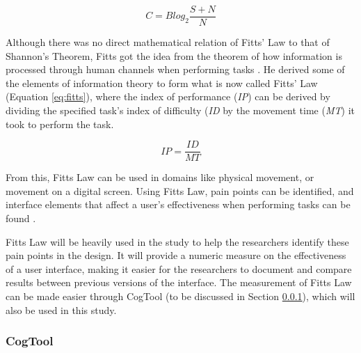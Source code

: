             \begin{equation}
            	\label{eq:shannon}
            	C = Blog_2 \frac{S + N}{N}
            \end{equation}
    
    		Although there was no direct mathematical relation of Fitts' Law to that of Shannon's Theorem, Fitts got the idea from the theorem of how information is processed through human channels when performing tasks \citep{mackenzie1992fitts}. He derived some of the elements of information theory to form what is now called Fitts' Law (Equation \ref{eq:fitts}), where the index of performance (\textit{IP}) can be derived by dividing the specified task's index of difficulty (\textit{ID} by the movement time (\textit{MT}) it took to perform the task. 
            
            \begin{equation}
            	\label{eq:fitts}
            	IP = \frac{ID}{MT}
            \end{equation}
            
            From this, Fitts Law can be used in domains like physical movement, or movement on a digital screen. Using Fitts Law, pain points can be identified, and interface elements that affect a user's effectiveness when performing tasks can be found \citep{mackenzie1992fitts}. 
            
            Fitts Law will be heavily used in the study to help the researchers identify these pain points in the design. It will provide a numeric measure on the effectiveness of a user interface, making it easier for the researchers to document and compare results between previous versions of the interface. The measurement of Fitts Law can be made easier through CogTool (to be discussed in Section \ref{sec:cogtool}), which will also be used in this study. 
            
    	\subsubsection{CogTool}
        \label{sec:cogtool}
        
        
